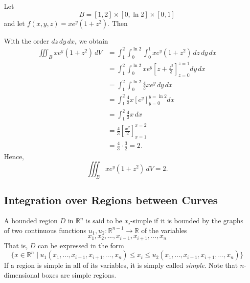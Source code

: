   \begin{example}
    Let 
    \[B = [1,2] \times [0,\ln 2] \times [0,1]\]
    and let $f(x,y,z) = x e^y (1+z^2)$. Then 
    \begin{center}
    \end{center}
    With the order $dz\,dy\,dx$, we obtain
    \begin{align*}
      \iiint_B x e^y (1+z^2)\,dV
      &= \int_1^2 \int_0^{\ln 2} \int_0^1 x e^y (1+z^2)\,dz\,dy\,dx \\
      &= \int_1^2 \int_0^{\ln 2} x e^y \left[ z + \frac{z^3}{3} \right]_{z=0}^{z=1} dy\,dx \\
      &= \int_1^2 \int_0^{\ln 2} \frac{4}{3} x e^y\,dy\,dx \\
      &= \int_1^2 \frac{4}{3} x \left[ e^y \right]_{y=0}^{y=\ln 2} dx \\
      &= \int_1^2 \frac{4}{3}x\,dx \\
      &= \frac{4}{3} \left[ \frac{x^2}{2} \right]_{x=1}^{x=2} \\
      &= \frac{4}{3}\cdot \frac{3}{2} = 2.
    \end{align*}
    Hence,
    \[\iiint_B x e^y (1+z^2)\,dV = 2.\]
  \end{example}

\subsection{Integration over Regions between Curves} 

  \begin{definition}
    A bounded region $D$ in $\mathbb{R}^n$ is said to be $x_i$-simple if it is bounded by the graphs of two continuous functions $u_1, u_2: \mathbb{R}^{n-1} \longrightarrow \mathbb{R}$ of the variables 
    \[x_1, x_2, ..., x_{i-1}, x_{i+1}, ..., x_n\]
    That is, $D$ can be expressed in the form 
    \[\{ x \in \mathbb{R}^n \; | \; u_1 (x_1,..., x_{i-1}, x_{i+1}, ... , x_n) \leq x_i \leq u_2 (x_1, ..., x_{i-1}, x_{i+1}, ..., x_n)\}\]
    If a region is simple in all of its variables, it is simply called \textit{simple}. Note that $n$-dimensional boxes are simple regions. 
  \end{definition}


